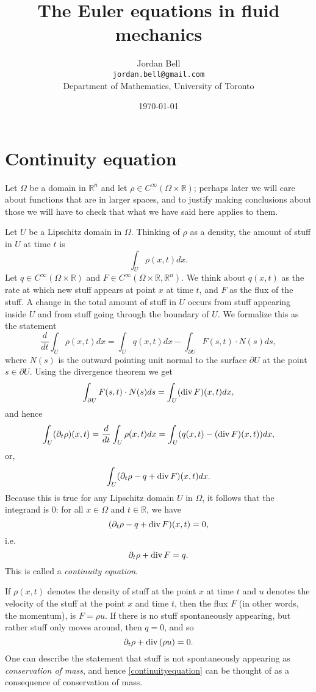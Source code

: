 \documentclass{article}
\renewcommand{\div}{\ensuremath\mathrm{div}\,}
\theoremstyle{definition}
\begin{document}
\title{The Euler equations in fluid mechanics}
\author{Jordan Bell\\ \texttt{jordan.bell@gmail.com}\\Department of Mathematics, University of Toronto}
\date{\today}

\maketitle

\section{Continuity equation}
Let $\Omega$ be a domain in $\mathbb{R}^n$ and let $\rho \in C^\infty(\Omega \times \mathbb{R})$; perhaps later we will
care about functions  that are in larger spaces, and to justify making conclusions about those we will
have to check that what we have said here applies to them. 

Let $U$ be a Lipschitz domain in $\Omega$. Thinking of $\rho$ as a density, the amount of stuff in $U$ at time $t$
is 
\[
\int_U \rho(x,t) dx.
\]
Let $q \in C^\infty(\Omega \times \mathbb{R})$ and $F \in C^\infty(\Omega \times \mathbb{R}, \mathbb{R}^n)$. 
We think about  $q(x,t)$ as the rate at which new stuff appears at point $x$
at time $t$, and $F$ as the flux  of the stuff.
A change in the total amount of stuff in $U$ occurs from stuff appearing inside $U$ and from stuff going through the boundary
of $U$. We formalize this as the statement
\[
\frac{d}{dt}\int_U \rho(x,t)dx = \int_U q(x,t) dx - \int_{\partial U} F(s,t) \cdot N(s) ds,
\]
where $N(s)$ is the outward pointing unit normal to the surface $\partial U$ at the point $s \in \partial U$. 
Using the divergence theorem we get
\[
\int_{\partial U} F(s,t) \cdot N(s) ds = \int_U (\div F)(x,t) dx,
\]
and hence
\[
\int_U (\partial_t \rho)(x,t) = \frac{d}{dt} \int_U \rho(x,t)dx = \int_U (q(x,t) - (\div F)(x,t)) dx,
\]
or,
\[
\int_U (\partial_t \rho - q + \div F)(x,t) dx.
\]
Because this is true for any Lipschitz domain $U$ in $\Omega$, it follows that the integrand is $0$: for all $x \in \Omega$ and $t \in \mathbb{R}$, we have
\[
(\partial_t \rho - q + \div F)(x,t) = 0,
\]
i.e.
\[
\partial_t \rho + \div F = q.
\]
This is called a {\em continuity equation}.

If $\rho(x,t)$ denotes the density of stuff at the point $x$ at time $t$ and $u$ denotes the velocity of the stuff at the point $x$
and time $t$, then the flux $F$ (in other words, the  momentum), is $F=\rho u$. If there is no stuff spontaneously appearing, but rather stuff only moves around,
then $q=0$, and so
\begin{equation}
\partial_t \rho + \div(\rho u) = 0.
\label{continuityequation}
\end{equation}
One can describe the statement that stuff is not spontaneously appearing as {\em conservation of mass}, and hence \eqref{continuityequation}
 can be thought of as a consequence of conservation of mass.
\end{document}
